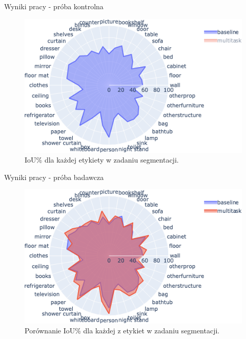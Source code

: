 \documentclass[10pt]{beamer}
\begin{document}
\begin{frame}{Wyniki pracy - próba kontrolna}
        
    \begin{figure}
        \includegraphics[width=\textwidth]{images/segmentation_polar_baseline.png}
        \caption{IoU\% dla każdej etykiety w zadaniu segmentacji.}
    \end{figure}
\end{frame}
\begin{frame}{Wyniki pracy - próba badawcza}
    \begin{figure}
        \includegraphics[width=\textwidth]{images/segmentation_polar.png}
        \caption{Porównanie IoU\% dla każdej z etykiet w zadaniu segmentacji.}
    \end{figure}
\end{frame}
\end{document}
